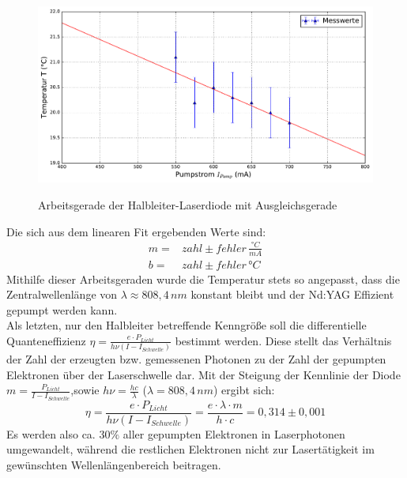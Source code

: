 \documentclass[twoside,colorback,accentcolor=tud4c,11pt]{tudreport}
\begin{document}
\begin{figure}[H]
\centering
   	\begin{minipage}[b]{0.9\textwidth}
   	\includegraphics[width=\textwidth]{graphics/arbeitsgerade_hld.pdf}
  	\label{ad}
   	\end{minipage}
\caption{Arbeitsgerade der Halbleiter-Laserdiode mit Ausgleichsgerade}	
\end{figure}
Die sich aus dem linearen Fit ergebenden Werte sind:
\begin{align}
m=&zahl \pm fehler\,\si{\frac{°C}{mA}}\\
b=&zahl \pm fehler\,\si{°C}
\end{align}
Mithilfe dieser Arbeitsgeraden wurde die Temperatur stets so angepasst, dass die Zentralwellenlänge von $\lambda\approx 808,4\,\si{nm}$ konstant bleibt und der Nd:YAG Effizient gepumpt werden kann.\\
Als letzten, nur den Halbleiter betreffende Kenngröße soll die differentielle Quanteneffizienz $\eta=\frac{e\cdot P_{Licht}}{h\nu (I-I_{Schwelle})}$ bestimmt werden. Diese stellt das Verhältnis der Zahl der erzeugten bzw. gemessenen Photonen zu der Zahl der gepumpten Elektronen über der Laserschwelle dar. Mit der Steigung der Kennlinie der Diode $m=\frac{P_{Licht}}{I-I_{Schwelle}}$,sowie $h\nu=\frac{hc}{\lambda}$ ($\lambda=808,4\,\si{nm}$) ergibt sich:
\begin{equation}
\eta=\frac{e\cdot P_{Licht}}{h\nu (I-I_{Schwelle})}=\frac{e\cdot\lambda\cdot m}{h\cdot c}=0,314 \pm 0,001
\end{equation}
Es werden also ca. $30\%$ aller gepumpten Elektronen in Laserphotonen umgewandelt, während die restlichen Elektronen nicht zur Lasertätigkeit im gewünschten Wellenlängenbereich beitragen.
\end{document}
